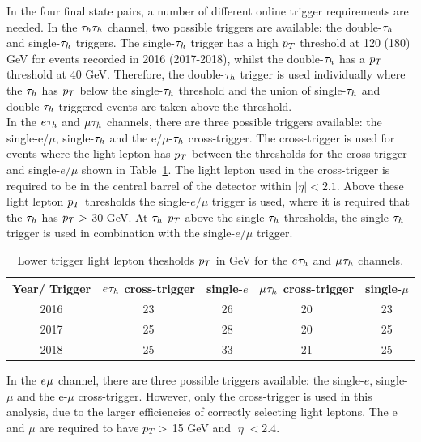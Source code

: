 In the four final state pairs, a number of different online trigger requirements are needed.
In the $\tau_{h}\tau_{h}$ channel, two possible triggers are available: the double-$\tau_{h}$ and single-$\tau_{h}$ triggers.
The single-$\tau_{h}$ trigger has a high $p_{T}$ threshold at 120 (180) GeV for events recorded in 2016 (2017-2018), whilst the double-$\tau_{h}$ has a $p_{T}$ threshold at 40 GeV.
Therefore, the double-$\tau_{h}$ trigger is used individually where the $\tau_{h}$ has $p_{T}$ below the single-$\tau_{h}$ threshold and the union of single-$\tau_{h}$ and double-$\tau_{h}$ triggered events are taken above the threshold. \\

In the $e_{}\tau_{h}$ and $\mu_{}\tau_{h}$ channels, there are three possible triggers available: the single-e/$\mu$, single-$\tau_{h}$ and the e/$\mu$-$\tau_{h}$ cross-trigger.
The cross-trigger is used for events where the light lepton has $p_{T}$ between the thresholds for the cross-trigger and single-$e/\mu$ shown in Table~\ref{tab:trig_thresholds}.
The light lepton used in the cross-trigger is required to be in the central barrel of the detector within $|\eta| < 2.1$.
Above these light lepton $p_{T}$ thresholds the single-$e/\mu$ trigger is used, where it is required that the $\tau_{h}$ has $p_{T} >$ 30 GeV.
At $\tau_{h}$ $p_{T}$ above the single-$\tau_{h}$ thresholds, the single-$\tau_{h}$ trigger is used in combination with the single-$e/\mu$ trigger. \\

\begin{table}[hbtp]
  \centering
  \begin{tabular}{|c||c|c|c|c|}
    \hline
    Year/ Trigger   & $e_{}\tau_{h}$ cross-trigger & single-$e$ & $\mu_{}\tau_{h}$ cross-trigger & single-$\mu$ \\
    \hline
    \hline
    2016 & 23                    & 26         & 20                     & 23           \\
    2017 & 25                    & 28         & 20                     & 25           \\
    2018 & 25                    & 33         & 21                     & 25           \\
    \hline        
  \end{tabular}
  \caption{Lower trigger light lepton thesholds $p_{T}$ in GeV for the $e_{}\tau_{h}$ and $\mu_{}\tau_{h}$ channels.}
  \label{tab:trig_thresholds}  
\end{table}

In the $e_{}\mu_{}$ channel, there are three possible triggers available: the single-$e$, single-$\mu$ and the e-$\mu$ cross-trigger.
However, only the cross-trigger is used in this analysis, due to the larger efficiencies of correctly selecting light leptons.
The e and $\mu$ are required to have $p_{T} >$ 15 GeV and $|\eta| < 2.4$.

